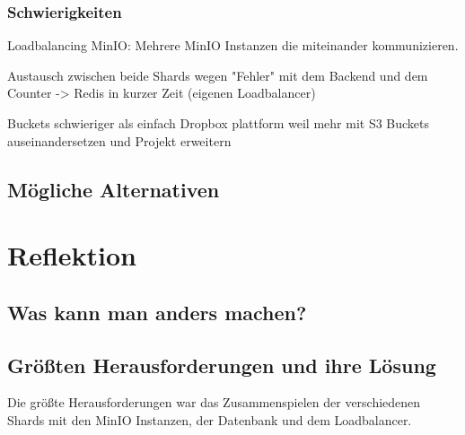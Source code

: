 \documentclass[12pt]{report}
\begin{document}
			\subsection{Schwierigkeiten}
			Loadbalancing MinIO: Mehrere MinIO Instanzen die miteinander kommunizieren.
			
			Austausch zwischen beide Shards wegen "Fehler" mit dem Backend und dem Counter -> Redis in kurzer Zeit (eigenen Loadbalancer)
			
			Buckets schwieriger als einfach Dropbox plattform weil mehr mit S3 Buckets auseinandersetzen und Projekt erweitern
			
	\section{Mögliche Alternativen}
	
\chapter{Reflektion}
	\section{Was kann man anders machen?}
	\section{Größten Herausforderungen und ihre Lösung}
	Die größte Herausforderungen war das Zusammenspielen der verschiedenen Shards mit den MinIO Instanzen, der Datenbank und dem Loadbalancer.

\newpage
{}
\setcounter{page}{\value{frontmatterPage}} %
\addtocounter{page}{1}

\renewcommand{\refname}{Literaturverzeichnis}


\end{document}
